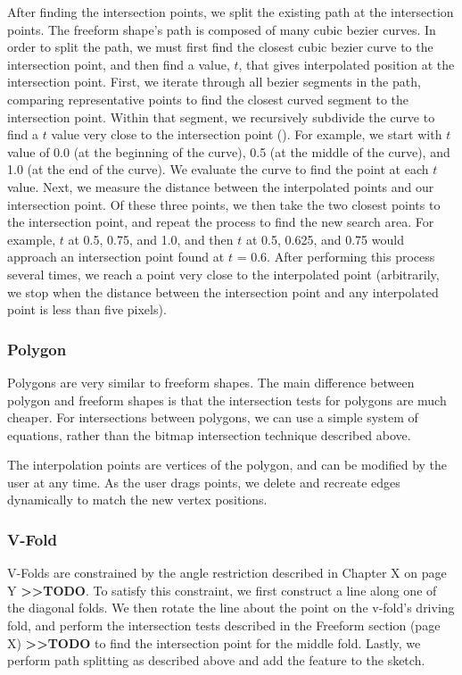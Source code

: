 After finding the intersection points, we split the existing path at the
intersection points. The freeform shape's path is composed of many cubic
bezier curves. In order to split the path, we must first find the
closest cubic bezier curve to the intersection point, and then find a
value, \(t\), that gives interpolated position at the intersection
point. First, we iterate through all bezier segments in the path,
comparing representative points to find the closest curved segment to
the intersection point. Within that segment, we recursively subdivide
the curve to find a \(t\) value very close to the intersection point
(\citet{phillips1997casteljau}). For example, we start with \(t\) value
of 0.0 (at the beginning of the curve), 0.5 (at the middle of the
curve), and 1.0 (at the end of the curve). We evaluate the curve to find
the point at each \(t\) value. Next, we measure the distance between the
interpolated points and our intersection point. Of these three points,
we then take the two closest points to the intersection point, and
repeat the process to find the new search area. For example, \(t\) at
0.5, 0.75, and 1.0, and then \(t\) at 0.5, 0.625, and 0.75 would
approach an intersection point found at \(t\) = 0.6. After performing
this process several times, we reach a point very close to the
interpolated point (arbitrarily, we stop when the distance between the
intersection point and any interpolated point is less than five pixels).

\subsubsection{Polygon}\label{polygon}

Polygons are very similar to freeform shapes. The main difference
between polygon and freeform shapes is that the intersection tests for
polygons are much cheaper. For intersections between polygons, we can
use a simple system of equations, rather than the bitmap intersection
technique described above.

The interpolation points are vertices of the polygon, and can be
modified by the user at any time. As the user drags points, we delete
and recreate edges dynamically to match the new vertex positions.

\subsubsection{V-Fold}\label{v-fold}

V-Folds are constrained by the angle restriction described in Chapter X
on page Y \textbf{\textgreater{}\textgreater{}TODO}. To satisfy this
constraint, we first construct a line along one of the diagonal folds.
We then rotate the line about the point on the v-fold's driving fold,
and perform the intersection tests described in the Freeform section
(page X) \textbf{\textgreater{}\textgreater{}TODO} to find the
intersection point for the middle fold. Lastly, we perform path
splitting as described above and add the feature to the sketch.

